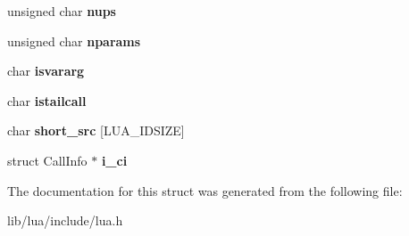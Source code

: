 \begin{DoxyCompactItemize}
\item 
\hypertarget{structlua___debug_ab87c2a6ef686abf10da683f7e9af1b23}{}unsigned char {\bfseries nups}\label{structlua___debug_ab87c2a6ef686abf10da683f7e9af1b23}

\item 
\hypertarget{structlua___debug_adb5efd1576224ce9d14f42f8bfee7a1a}{}unsigned char {\bfseries nparams}\label{structlua___debug_adb5efd1576224ce9d14f42f8bfee7a1a}

\item 
\hypertarget{structlua___debug_a943220c57a4dd46dcc1bcd1198cfea88}{}char {\bfseries isvararg}\label{structlua___debug_a943220c57a4dd46dcc1bcd1198cfea88}

\item 
\hypertarget{structlua___debug_a08e9cf647790ffeb068db293c7572260}{}char {\bfseries istailcall}\label{structlua___debug_a08e9cf647790ffeb068db293c7572260}

\item 
\hypertarget{structlua___debug_a9b953c2fa9ef95a72a9ffc423744e1a4}{}char {\bfseries short\+\_\+src} \mbox{[}L\+U\+A\+\_\+\+I\+D\+S\+I\+Z\+E\mbox{]}\label{structlua___debug_a9b953c2fa9ef95a72a9ffc423744e1a4}

\item 
\hypertarget{structlua___debug_a6cfa3d2272ea187b08164b0a2081d59d}{}struct Call\+Info $\ast$ {\bfseries i\+\_\+ci}\label{structlua___debug_a6cfa3d2272ea187b08164b0a2081d59d}

\end{DoxyCompactItemize}


The documentation for this struct was generated from the following file\+:\begin{DoxyCompactItemize}
\item 
lib/lua/include/lua.\+h\end{DoxyCompactItemize}

